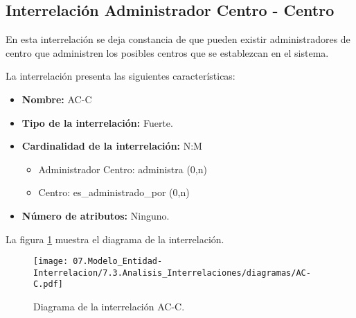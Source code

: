 \subsection{Interrelación Administrador Centro - Centro}

   \begin{description}
      \item[Definición] En esta interrelación se deja constancia de que pueden
      existir administradores de centro que administren los posibles centros
      que se establezcan en el sistema.

      \item[Características] La interrelación presenta las siguientes
                             características:

         \begin{itemize}
            \item \textbf{Nombre:} AC-C
            \item \textbf{Tipo de la interrelación:} Fuerte.
            \item \textbf{Cardinalidad de la interrelación:} N:M
                  \begin{itemize}
                     \item Administrador Centro: administra (0,n)
                     \item Centro: es\_administrado\_por (0,n)
                  \end{itemize}
            \item \textbf{Número de atributos:} Ninguno.
         \end{itemize}

      \item[Diagrama] La figura \ref{diagramaAC-C} muestra el diagrama de la
                      interrelación.
      \item \begin{figure}[!ht]
            \begin{center}
            \texttt{[image: 07.Modelo\_Entidad-Interrelacion/7.3.Analisis\_Interrelaciones/diagramas/AC-C.pdf]}
            \caption{Diagrama de la interrelación AC-C.}
            \label{diagramaAC-C}
            \end{center}
         \end{figure}

      \item[Ejemplo práctico del tipo de interrelación]


\end{description}
